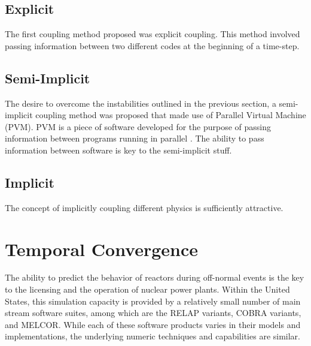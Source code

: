 \subsection{Explicit}
\label{subsect:coupling_explicit}
The first coupling method proposed was explicit coupling.
This method involved passing information between two different codes at the beginning of a time-step.


\subsection{Semi-Implicit}
\label{subsect:coupling_semi_implicit}
The desire to overcome the instabilities outlined in the previous section, a semi-implicit coupling method was proposed that made use of Parallel Virtual Machine (PVM).
PVM is a piece of software developed for the purpose of passing information between programs running in parallel \cite{Geist1994}. 
The ability to pass information between software is key to the semi-implicit stuff. 

\subsection{Implicit}
\label{subsect:coupling_implicit}
The concept of implicitly coupling different physics is sufficiently attractive. 
\section{Temporal Convergence}
\label{sect:temporal_convergence}
The ability to predict the behavior of reactors during off-normal events is the key to the licensing and the operation of nuclear power plants.
Within the United States, this simulation capacity is provided by a relatively small number of main stream software suites, among which are the RELAP variants, COBRA variants, and MELCOR.
While each of these software products varies in their models and implementations, the underlying numeric techniques and capabilities are similar.

